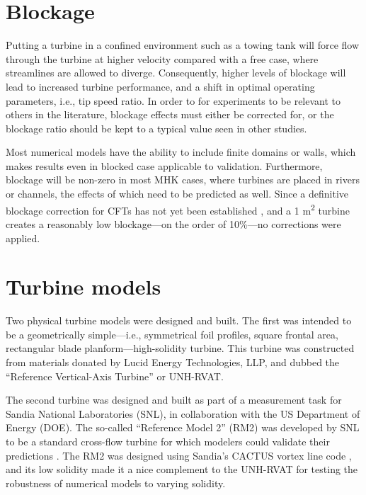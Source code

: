 \section{Blockage}

Putting a turbine in a confined environment such as a towing tank will force
flow through the turbine at higher velocity compared with a free case, where
streamlines are allowed to diverge. Consequently, higher levels of blockage will
lead to increased turbine performance, and a shift in optimal operating
parameters, i.e., tip speed ratio. In order to for experiments to be relevant to
others in the literature, blockage effects must either be corrected for, or the
blockage ratio should be kept to a typical value seen in other studies.

Most numerical models have the ability to include finite domains or walls, which
makes results even in blocked case applicable to validation. Furthermore,
blockage will be non-zero in most MHK cases, where turbines are placed in rivers
or channels, the effects of which need to be predicted as well. Since a
definitive blockage correction for CFTs has not yet been established
\cite{Cavagnaro2014, Dossena2015}, and a 1 m\textsuperscript{2} turbine creates
a reasonably low blockage---on the order of 10\%---no corrections were applied.


\section{Turbine models}

Two physical turbine models were designed and built. The first was intended to
be a geometrically simple---i.e., symmetrical foil profiles, square frontal
area, rectangular blade planform---high-solidity turbine. This turbine was
constructed from materials donated by Lucid Energy Technologies, LLP, and dubbed
the ``Reference Vertical-Axis Turbine'' or UNH-RVAT.

The second turbine was designed and built as part of a measurement task for
Sandia National Laboratories (SNL), in collaboration with the US Department of
Energy (DOE). The so-called ``Reference Model 2'' (RM2) was developed by SNL to
be a standard cross-flow turbine for which modelers could validate their
predictions \cite{Neary2014}. The RM2 was designed using Sandia's CACTUS vortex
line code \cite{Barone2011}, and its low solidity made it a nice complement to
the UNH-RVAT for testing the robustness of numerical models to varying solidity.


